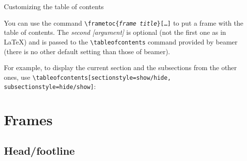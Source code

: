 \documentclass[9pt]{beamer}
\def\com#1{\texttt{\textbackslash #1}}
\let\command\com
\begin{document}
\begin{frame}
  {Customizing the table of contents}

  You can use the command %
  \command{frametoc\{\textsl{frame title}\}[\dots]} %
  to put a frame with the table of contents. The \emph{second
    [argument]} is optional (not the first one as in \LaTeX) and is
  passed to the \command{tableofcontents} command provided by beamer
  (there is no other default setting than those of beamer).

  For example, to display the current section and the subsections from
  the other ones, use %
  \command{tableofcontents[sectionstyle=show/hide,
    subsectionstyle=hide/show]}:

  \parskip0pt
  \tableofcontents[sectionstyle=show/hide, subsectionstyle=hide/show]

\end{frame}



\section{Frames}
\subsection{Head/footline}

\setupheadline[left=section]
\end{document}
